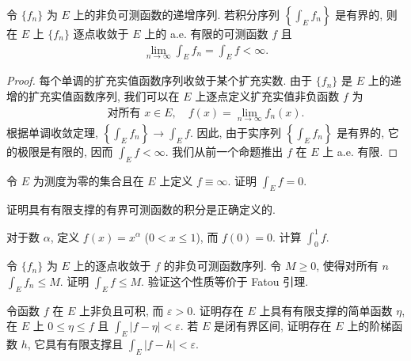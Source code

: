 \documentclass[../../main.tex]{subfiles}
\begin{document}
\begin{lemma}\label{lemma:ch04-BeppoLevi}
令 $\{f_{n}\}$ 为 $E$ 上的非负可测函数的递增序列. 若积分序列 $\left\{\int_{E}f_{n}\right\}$ 是有界的, 则在 $E$ 上 $\{f_{n}\}$ 逐点收敛于 $E$ 上的 a.e. 有限的可测函数 $f$ 且
\begin{align*}
\lim_{n\to\infty}\int_{E}f_{n}=\int_{E}f<\infty.
\end{align*}
\end{lemma}

\begin{proof}
每个单调的扩充实值函数序列收敛于某个扩充实数. 由于 $\{f_{n}\}$ 是 $E$ 上的递增的扩充实值函数序列, 我们可以在 $E$ 上逐点定义扩充实值非负函数 $f$ 为
\begin{align*}
\text{对所有 }x\in E,\quad f(x)=\lim_{n\to\infty}f_{n}(x).
\end{align*}
根据单调收敛定理, $\left\{\int_{E}f_{n}\right\}\to\int_{E}f$. 因此, 由于实序列 $\left\{\int_{E}f_{n}\right\}$ 是有界的, 它的极限是有限的, 因而 $\int_{E}f<\infty$. 我们从前一个命题推出 $f$ 在 $E$ 上 a.e. 有限.
\end{proof}

\begin{exercise}\label{exercise:ch04-17}
令 $E$ 为测度为零的集合且在 $E$ 上定义 $f\equiv\infty$. 证明 $\int_{E}f=0$.
\end{exercise}

\begin{exercise}\label{exercise:ch04-18}
证明具有有限支撑的有界可测函数的积分是正确定义的.
\end{exercise}

\begin{exercise}\label{exercise:ch04-19}
对于数 $\alpha$, 定义 $f(x)=x^{\alpha}$ ($0<x\leqslant 1$), 而 $f(0)=0$. 计算 $\int_{0}^{1}f$.
\end{exercise}

\begin{exercise}\label{exercise:ch04-20}
令 $\{f_{n}\}$ 为 $E$ 上的逐点收敛于 $f$ 的非负可测函数序列. 令 $M\geqslant 0$, 使得对所有 $n$ $\int_{E}f_{n}\leqslant M$. 证明 $\int_{E}f\leqslant M$. 验证这个性质等价于 Fatou 引理.
\end{exercise}

\begin{exercise}\label{exercise:ch04-21}
令函数 $f$ 在 $E$ 上非负且可积, 而 $\varepsilon>0$. 证明存在 $E$ 上具有有限支撑的简单函数 $\eta$, 在 $E$ 上 $0\leqslant\eta\leqslant f$ 且 $\int_{E}|f-\eta|<\varepsilon$. 若 $E$ 是闭有界区间, 证明存在 $E$ 上的阶梯函数 $h$, 它具有有限支撑且 $\int_{E}|f-h|<\varepsilon$.
\end{exercise}
\end{document}
